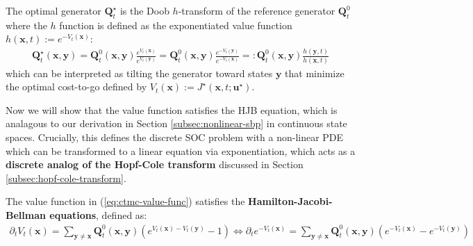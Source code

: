 \documentclass{article}
\begin{document}
\begin{remark}\label{remark:ctmc-doob}
The optimal generator $\boldsymbol{Q}^\star_t$ is the Doob $h$-transform of the reference generator $\boldsymbol{Q}^0_t$ where the $h$ function is defined as the exponentiated value function $h(\boldsymbol{x},t):=e^{-V_t(\boldsymbol{x})}$:
\begin{align}
\boldsymbol{Q}^\star_t(\boldsymbol{x},\boldsymbol{y})=\boldsymbol{Q}^0_t(\boldsymbol{x},\boldsymbol{y})\frac{e^{V_t(\boldsymbol{x})}}{e^{V_t(\boldsymbol{y})}}=\boldsymbol{Q}^0_t(\boldsymbol{x},\boldsymbol{y})\frac{e^{-V_t(\boldsymbol{y})}}{e^{-V_t(\boldsymbol{x})}}=:\boldsymbol{Q}^0_t(\boldsymbol{x},\boldsymbol{y})\frac{h(\boldsymbol{y},t)}{h(\boldsymbol{x},t)}
\end{align}
which can be interpreted as tilting the generator toward states $\boldsymbol{y}$ that minimize the optimal cost-to-go defined by $V_t(\boldsymbol{x}):= J^\star(\boldsymbol{x},t;\boldsymbol{u}^\star)$.
\end{remark}

Now we will show that the value function satisfies the HJB equation, which is analagous to our derivation in Section \ref{subsec:nonlinear-sbp} in continuous state spaces. Crucially, this defines the discrete SOC problem with a non-linear PDE which can be transformed to a linear equation via exponentiation, which acts as a \textbf{discrete analog of the Hopf-Cole transform} discussed in Section \ref{subsec:hopf-cole-transform}.

\begin{corollary}\label{corollary:ctmc-hjb}
    The value function in (\ref{eq:ctmc-value-func}) satisfies the \textbf{Hamilton-Jacobi-Bellman equations}, defined as:
    \begin{align}
        \partial_tV_t(\boldsymbol{x})=\sum_{\boldsymbol{y}\neq \boldsymbol{x}}\boldsymbol{Q}_t^0(\boldsymbol{x},\boldsymbol{y})\left(e^{V_t(\boldsymbol{x})-V_t(\boldsymbol{y})}-1\right)\iff\partial_te^{-V_t(\boldsymbol{x})}=\sum_{\boldsymbol{y}\ne\boldsymbol{x}}\boldsymbol{Q}^0_t(\boldsymbol{x},\boldsymbol{y})\left(e^{-V_t(\boldsymbol{x})}-e^{-V_t(\boldsymbol{y})}\right)\nonumber
    \end{align}
\end{corollary}
\end{document}
